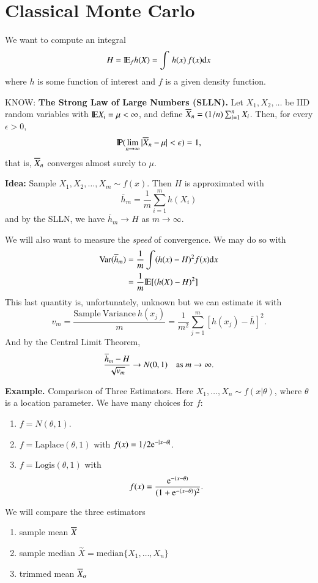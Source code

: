 \documentclass[captions=tableheading]{scrbook}
\begin{document}
\section{Classical Monte Carlo}
\label{sec-3_2}


We want to compute an integral 
\[
H=\mathrm{I\hspace{-1.5pt}E}_{f}h(X)=\int\, h(x)\, f(x)\mathrm{d} x
\]
where $h$ is some function of interest and $f$ is a given density function.

KNOW: \textbf{The Strong Law of Large Numbers (SLLN).} Let $X_{1},X_{2},\ldots$ be IID random variables with $\mathrm{I\hspace{-1.5pt}E} X_{i} = \mu < \infty$, and define $\overline{X}_{n}=(1/n)\sum_{i=1}^{n}X_{i}$. Then, for every $\epsilon>0$, 
\[
\mathrm{I\hspace{-1.5pt}P}(\lim_{n\to\infty}|\overline{X}_{n}-\mu|<\epsilon)=1,
\]
that is, $\overline{X}_{n}$ converges almost surely to $\mu$.

\textbf{Idea:} Sample \(X_{1},X_{2},\ldots,X_{m}\sim f(x)\). Then $H$ is approximated with 
\[
\overline{h}_{m}=\frac{1}{m}\sum_{i=1}^{m}h(X_{i})
\]
and by the SLLN, we have $\overline{h}_{m}\to H$ as $m\to\infty$.

We will also want to measure the \emph{speed} of convergence. We may do so with 
\begin{align*}
\mathrm{Var}(\overline{h}_{m}) & =\frac{1}{m}\int(h(x)-H)^{2}f(x)\mathrm{d} x\\
 & =\frac{1}{m}\mathrm{I\hspace{-1.5pt}E}[(h(X)-H)^{2}]
\end{align*}
This last quantity is, unfortunately, unknown but we can estimate it with 
\[
v_{m}=\frac{\mathrm{Sample\ Variance}\ h(x_{j})}{m}=\frac{1}{m^{2}}\sum_{j=1}^{m}[h(x_{j})-\overline{h}]^{2}.
\]
And by the Central Limit Theorem, 
\[
\frac{\overline{h}_{m}-H}{\sqrt{v_{m}}}\to N(0,1)\quad\mbox{as \ensuremath{m\to\infty}}.
\]


\textbf{Example.} Comparison of Three Estimators. Here $X_{1},\ldots,X_{n}\sim f(x|\theta)$, where $\theta$ is a location parameter. We have many choices for $f$:

\begin{enumerate}
\item $f = N(\theta,1)$.
\item $f = \mathrm{Laplace}(\theta,1)$ with $f(x)=1/2 \mathrm{e}^{-|x-\theta|}$.
\item $f = \mathrm{Logis}(\theta,1)$ with 
   \[
   f(x)=\frac{\mathrm{e}^{-(x-\theta)}}{(1 + \mathrm{e}^{-(x - \theta)})^{2}}.
   \]
\end{enumerate}

We will compare the three estimators

\begin{enumerate}
\item sample mean $\overline{X}$
\item sample median $\overset{\sim}{X}=\mbox{median}\{X_{1},\ldots,X_{n}\}$
\item trimmed mean $\overline{X}_{\alpha}$
\end{enumerate}
\end{document}
